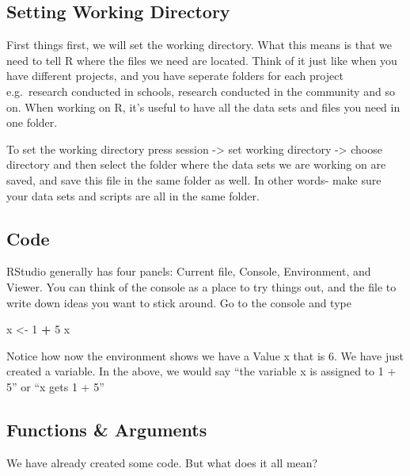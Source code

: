 \documentclass[]{book}
\newenvironment{Shaded}{\begin{snugshade}}{\end{snugshade}}
\newcommand{\DecValTok}[1]{\textcolor[rgb]{0.00,0.00,0.81}{#1}}
\newcommand{\NormalTok}[1]{#1}
\newcommand{\OperatorTok}[1]{\textcolor[rgb]{0.81,0.36,0.00}{\textbf{#1}}}
\newcommand{\StringTok}[1]{\textcolor[rgb]{0.31,0.60,0.02}{#1}}
\begin{document}
\hypertarget{setting-working-directory}{%
\subsection{Setting Working Directory}\label{setting-working-directory}}

First things first, we will set the working directory. What this means is that we need to tell R where the files we need are located. Think of it just like when you have different projects, and you have seperate folders for each project e.g.~research conducted in schools, research conducted in the community and so on. When working on R, it's useful to have all the data sets and files you need in one folder.

To set the working directory press session -\textgreater{} set working directory -\textgreater{} choose directory and then select the folder where the data sets we are working on are saved, and save this file in the same folder as well. In other words- make sure your data sets and scripts are all in the same folder.

\hypertarget{code}{%
\subsection{Code}\label{code}}

RStudio generally has four panels: Current file, Console, Environment, and Viewer. You can think of the console as a place to try things out, and the file to write down ideas you want to stick around. Go to the console and type

\begin{Shaded}
\begin{Highlighting}[]
\NormalTok{x <-}\StringTok{ }\DecValTok{1} \OperatorTok{+}\StringTok{ }\DecValTok{5}
\NormalTok{x}
\end{Highlighting}
\end{Shaded}

Notice how now the environment shows we have a Value x that is 6. We have just created a variable. In the above, we would say ``the variable x is assigned to 1 + 5'' or ``x gets 1 + 5''

\hypertarget{functions-arguments}{%
\subsection{Functions \& Arguments}\label{functions-arguments}}

We have already created some code. But what does it all mean?
\end{document}
